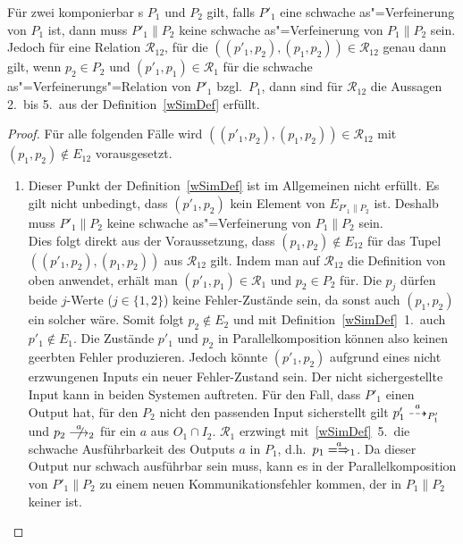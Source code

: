 \begin{Lem}
  \label{schwVerfParallelLem}
  Für zwei komponierbar \MEIO{}s $P_1$ und $P_2$ gilt, falls $P'_1$ eine
  schwache as"=Verfeinerung von $P_1$ ist, dann muss $P'_1\|P_2$ keine
  schwache as"=Verfeinerung von $P_1\|P_2$ sein. Jedoch für eine Relation
  $\mathcal{R}_{12}$, für die $((p'_1,p_2),(p_1,p_2)) \in \mathcal{R}_{12}$
  genau dann gilt, wenn $p_2 \in P_2$ und $(p'_1,p_1)\in\mathcal{R}_1$ für die
  schwache as"=Verfeinerungs"=Relation von $P'_1$ bzgl.\ $P_1$, dann sind für
  $\mathcal{R}_{12}$ die Aussagen 2.\ bis 5.\ aus der Definition~\ref{wSimDef}
  erfüllt.
\end{Lem}
\begin{proof}
  Für alle folgenden Fälle wird $((p'_1,p_2),(p_1,p_2))\in\mathcal{R}_{12}$
  mit $(p_1,p_2)\notin E_{12}$ vorausgesetzt.
  \begin{enumerate}
    \item Dieser Punkt der Definition~\ref{wSimDef} ist im Allgemeinen nicht
      erfüllt. Es gilt nicht unbedingt, dass $(p'_1,p_2)$ kein Element von
      $E_{P'_1\|P_2}$ ist. Deshalb muss $P'_1\|P_2$ keine schwache
      as"=Verfeinerung von $P_1\|P_2$ sein.\\
      Dies folgt direkt aus der Voraussetzung, dass $(p_1,p_2)\notin E_{12}$
      für das Tupel $((p'_1,p_2),(p_1,p_2))$ aus $\mathcal{R}_{12}$ gilt. Indem
      man auf $\mathcal{R}_{12}$ die Definition von oben anwendet, erhält man
      $(p'_1,p_1)\in\mathcal{R}_1$ und $p_2\in P_2$ für. Die $p_j$ dürfen beide
      $j$-Werte ($j\in\{1,2\}$) keine Fehler-Zustände sein, da sonst auch
      $(p_1,p_2)$ ein solcher wäre. Somit folgt $p_2\notin E_2$ und mit
      Definition~\ref{wSimDef}~1.\ auch $p'_1\notin E_1$. Die Zustände $p'_1$
      und $p_2$ in Parallelkomposition können also keinen geerbten Fehler
      produzieren. Jedoch könnte $(p'_1,p_2)$ aufgrund eines nicht erzwungenen
      Inputs ein neuer Fehler-Zustand sein. Der nicht sichergestellte Input
      kann in beiden Systemen auftreten. Für den Fall, dass $P'_1$ einen Output
      hat, für den $P_2$ nicht den passenden Input sicherstellt gilt
      $p'_1\may[a]_{P'_1}$ und $p_2\nmust[a]_2$ für ein $a$ aus $O_1\cap I_2$.
      $\mathcal{R}_1$ erzwingt mit~\ref{wSimDef}~5.\ die schwache
      Ausführbarkeit des Outputs $a$ in $P_1$, d.h.\ $p_1 \weakmay[a]_1$. Da
      dieser Output nur schwach ausführbar sein muss, kann es in der
      Parallelkomposition von $P'_1\|P_2$ zu einem neuen Kommunikationsfehler
      kommen, der in $P_1\|P_2$ keiner ist.\\

\end{enumerate}
\end{proof}
